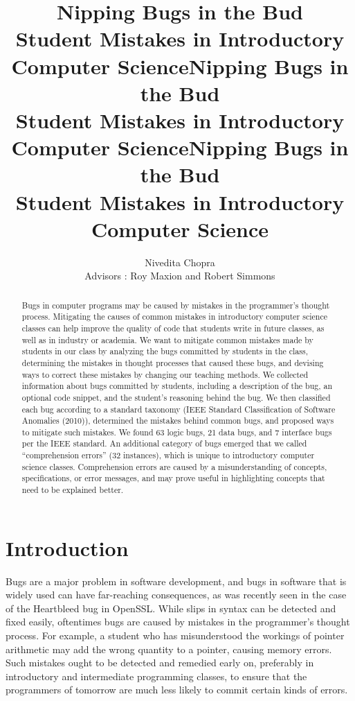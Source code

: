 \documentclass{sig-alternate}
\title{Nipping Bugs in the Bud\\ Student Mistakes in Introductory Computer Science}
\author{
\alignauthor
}
\title{\textbf{\Large{Nipping Bugs in the Bud\\ Student Mistakes in Introductory Computer Science}}}
\author{Nivedita Chopra\\ Advisors : Roy Maxion and Robert Simmons}
\date{}
\makeatletter
\newcommand{\acmtitle}[0]{
\title{Nipping Bugs in the Bud\\ Student Mistakes in Introductory Computer Science}
\numberofauthors{3}
\author{
\alignauthor
}
\maketitle
}
\newcommand{\thesistitle}[0]{
\title{\textbf{\Large{Nipping Bugs in the Bud\\ Student Mistakes in Introductory Computer Science}}}
\author{Nivedita Chopra\\ Advisors : Roy Maxion and Robert Simmons}
\date{}
\maketitle
\thispagestyle{empty}
\clearpage
}
\makeatother
\begin{document}
\acmtitle

\setcounter{page}{1}

\def\numlogicIEEE{66 }
\def\numdataIEEE{24 }
\def\numinterfaceIEEE{7 }
\def\numotherIEEE{26 }

\def\numlogic{63 }
\def\numdata{21 }
\def\numinterface{7 }
\def\numcomp{32 }
\def\numtotal{123 }
\def\numedge{31 }

\begin{abstract}
Bugs in computer programs may be caused by mistakes in the programmer's thought process. Mitigating the causes of common mistakes in introductory computer science classes can help improve the quality of code that students write in future classes, as well as in industry or academia. We want to mitigate common mistakes made by students in our class by analyzing the bugs committed by students in the class, determining the mistakes in thought processes that caused these bugs, and devising ways to correct these mistakes by changing our teaching methods. We collected information about bugs committed by students, including a description of the bug, an optional code snippet, and the student's reasoning behind the bug. We then classified each bug according to a standard taxonomy (IEEE Standard Classification of Software Anomalies (2010)), determined the mistakes behind common bugs, and proposed ways to mitigate such mistakes. We found \numlogic logic bugs, \numdata data bugs, and \numinterface interface bugs per the IEEE standard. An additional category of bugs emerged that we called ``comprehension errors'' (\numcomp instances), which is unique to introductory computer science classes. Comprehension errors are caused by a misunderstanding of concepts, specifications, or error messages, and may prove useful in highlighting concepts that need to be explained better. 

\end{abstract}

\section{Introduction}
\label{sec:intro}

Bugs are a major problem in software development, and bugs in software that is widely used can have far-reaching consequences, as was recently seen in the case of the Heartbleed bug in OpenSSL. While slips in syntax can be detected and fixed easily, oftentimes bugs are caused by mistakes in the programmer's thought process. For example, a student who has misunderstood the workings of pointer arithmetic may add the wrong quantity to a pointer, causing memory errors. Such mistakes ought to be detected and remedied early on, preferably in introductory and intermediate programming classes, to ensure that the programmers of tomorrow are much less likely to commit certain kinds of errors. 
\end{document}
